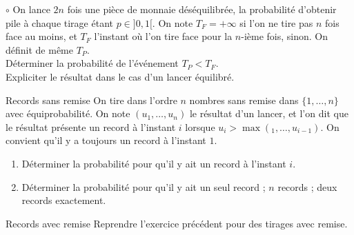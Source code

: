 \documentclass[french,a4paper]{article}
\theoremstyle{plain}
\theoremstyle{definition}
\theoremstyle{remark}
\begin{document}
\begin{ex}{$\circ$}
	On lance $2n$ fois une pièce de monnaie déséquilibrée, la probabilité d'obtenir pile à chaque tirage étant $p\in]0,1[$. On note $T_F=+\infty$ si l'on ne tire pas $n$ fois face au moins, et $T_F$ l'instant où l'on tire face pour la $n$-ième fois, sinon. On définit de même $T_P$. \\ Déterminer la probabilité de l'événement $T_P<T_F$. \\ Expliciter le résultat dans le cas d'un lancer équilibré.
\end{ex}

\begin{ex}{Records sans remise}
	On tire dans l'ordre $n$ nombres sans remise dans $\{1,\ldots,n\}$ avec équiprobabilité. On note $(u_1,\ldots,u_n)$ le résultat d'un lancer, et l'on dit que le résultat présente un record à l'instant $i$ lorsque $u_i>\max(_1,\ldots,u_{i-1})$. On convient qu'il y a toujours un record à l'instant $1$.
	\begin{enumerate}
		\item Déterminer la probabilité pour qu'il y ait un record à l'instant $i$.
		\item Déterminer la probabilité pour qu'il y ait un seul record ; $n$ records ; deux records exactement.
	\end{enumerate}
\end{ex}

\begin{ex}{Records avec remise}
	Reprendre l'exercice précédent pour des tirages avec remise.
\end{ex}
\end{document}
